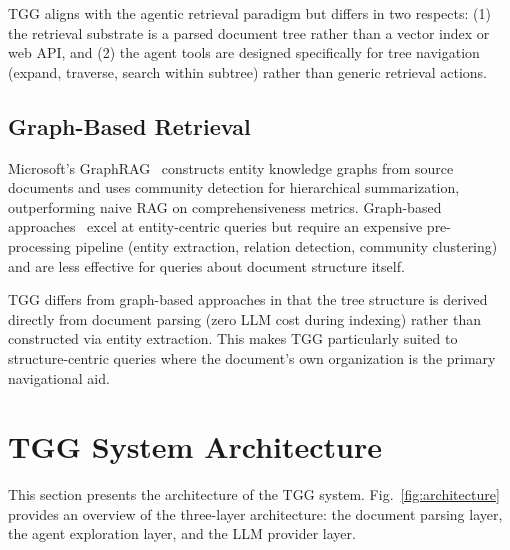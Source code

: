 \documentclass[conference]{IEEEtran}
\begin{document}
TGG aligns with the agentic retrieval paradigm but differs in two respects: (1) the retrieval substrate is a parsed document tree rather than a vector index or web API, and (2) the agent tools are designed specifically for tree navigation (expand, traverse, search within subtree) rather than generic retrieval actions.

\subsection{Graph-Based Retrieval}

Microsoft's GraphRAG~\cite{edge2024graphrag} constructs entity knowledge graphs from source documents and uses community detection for hierarchical summarization, outperforming naive RAG on comprehensiveness metrics. Graph-based approaches~\cite{graphragsurvey2024} excel at entity-centric queries but require an expensive pre-processing pipeline (entity extraction, relation detection, community clustering) and are less effective for queries about document structure itself.

TGG differs from graph-based approaches in that the tree structure is derived directly from document parsing (zero LLM cost during indexing) rather than constructed via entity extraction. This makes TGG particularly suited to structure-centric queries where the document's own organization is the primary navigational aid.

\section{TGG System Architecture}

This section presents the architecture of the TGG system. Fig.~\ref{fig:architecture} provides an overview of the three-layer architecture: the document parsing layer, the agent exploration layer, and the LLM provider layer.
\end{document}
